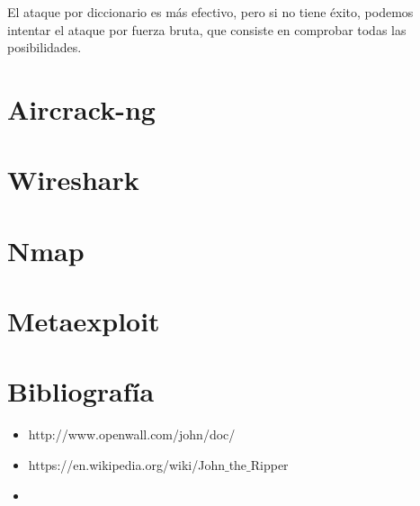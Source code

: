 \documentclass[a4paper, 11pt]{article}
\theoremstyle{plain}
\begin{document}
El ataque por diccionario es más efectivo, pero si no tiene éxito, podemos intentar el ataque por fuerza bruta, que consiste en comprobar todas las posibilidades.

\section{Aircrack-ng}



\section{Wireshark}
\section{Nmap}
\section{Metaexploit}


\section{Bibliografía}
\begin{itemize}
	\item http://www.openwall.com/john/doc/
	\item https://en.wikipedia.org/wiki/John$\_$the$\_$Ripper
	\item 
\end{itemize}
\end{document}
